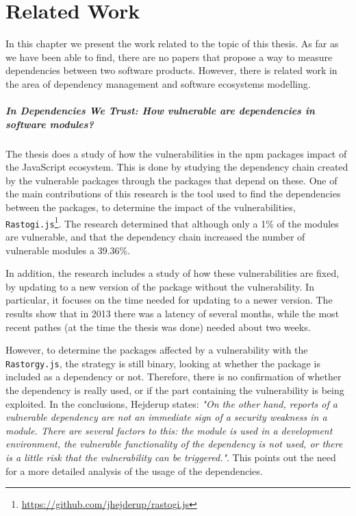 \chapter{Related Work}\label{ch:RelatedWork}
In this chapter we present the work related to the topic of this thesis.
As far as we have been able to find, there are no papers that propose a way to measure dependencies between two software products. However, there is related work in the area of dependency management and software ecosystems modelling.

\paragraph{In Dependencies We Trust: How vulnerable are dependencies in software modules? \cite{hejderup2015dependencies}}
The thesis does a study of how the vulnerabilities in the npm packages impact of the JavaScript ecosystem. This is done by studying the dependency chain created by the vulnerable packages through the packages that depend on these. One of the main contributions of this research is the tool used to find the dependencies between the packages, to determine the impact of the vulnerabilities, \texttt{Rastogi.js}\footnote{\href{https://github.com/jhejderup/rastogi.js}{https://github.com/jhejderup/rastogi.js}}. The research determined that although only a 1\% of the modules are vulnerable, and that the dependency chain increased the number of vulnerable modules a 39.36\%.

In addition, the research includes a study of how these vulnerabilities are fixed, by updating to a new version of the package without the vulnerability. In particular, it focuses on the time needed for updating to a newer version. The results show that in 2013 there was a latency of several months, while the most recent pathes (at the time the thesis was done) needed about two weeks.

However, to determine the packages affected by a vulnerability with the \texttt{Rastorgy.js}, the strategy is still binary, looking at whether the package is included as a dependency or not. Therefore, there is no confirmation of whether the dependency is really used, or if the part containing the vulnerability is being exploited. In the conclusions, Hejderup states: \textit{"On the other hand, reports of a vulnerable dependency are not an immediate sign of a security weakness in a module. There are several factors to this: the module is used in a development environment, the vulnerable functionality of the dependency is not used, or there is a little risk that the vulnerability can be triggered."}. This points out the need for a more detailed analysis of the usage of the dependencies.

